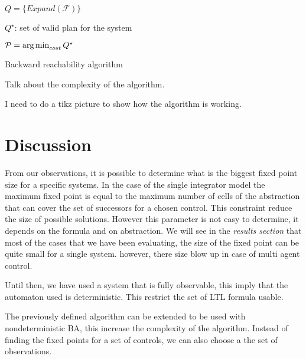 \begin{algorithm}[H]
\SetAlgoNoLine
{}

 $Q = \{ Expand(\mathcal{F}) \}$\;

 $Q^\star$: set of valid plan for the system\; 
 
 $\mathcal{P} = \operatorname*{arg\,min}_{cost}{Q^\star}$\;
 
 \caption{Backward reachability algorithm}
\end{algorithm}

Talk about the complexity of the algorithm.

I need to do a tikz picture to show how the algorithm is working.

\section{Discussion}
From our observations, it is possible to determine what is the biggest fixed point size for a specific systems.
In the case of the single integrator model the maximum fixed point is equal to the maximum number of cells of the abstraction that can cover the set of successors for a chosen control.
This constraint reduce the size of possible solutions.
However this parameter is not easy to determine, it depends on the formula and on abstraction.
We will see in the \textit{results section} that most of the cases that we have been evaluating, the size of the fixed point can be quite small for a single system. however, there size blow up in case of multi agent control.

Until then, we have used a system that is fully observable, this imply that the \buchi{} automaton used is deterministic.
This restrict the set of LTL formula usable. 

The previously defined algorithm can be extended to be used with nondeterministic BA, this increase the complexity of the algorithm. 
Instead of finding the fixed points for a set of controls, we can also choose a the set of observations.

